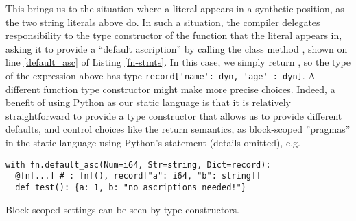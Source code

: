 This brings us to the situation where a literal appears in a synthetic position, as the two string literals above do. In such a situation, the compiler delegates responsibility to the type constructor of the function that the literal appears in, asking it to provide a ``default ascription'' by calling the class method , shown on line \ref{default_asc} of Listing \ref{fn-stmts}. In this case, we simply return , so the type of the expression above has type \lstinline[basicstyle=\ttfamily\small]{record['name': dyn, 'age' : dyn]}. A different function type constructor might make more precise choices. Indeed, a benefit of using Python as our static language is that it is relatively straightforward to provide a type constructor that allows us to provide different defaults, and control choices like the return semantics, as block-scoped ''pragmas'' in the static language using Python's  statement \cite{python} (details omitted), e.g. 
\begin{codelisting}[h]
\begin{lstlisting}[numbers=none]
with fn.default_asc(Num=i64, Str=string, Dict=record):
  @fn[...] # : fn[(), record["a": i64, "b": string]]
  def test(): {a: 1, b: "no ascriptions needed!"} 
\end{lstlisting}
\caption{Block-scoped settings can be seen by type constructors.}
\label{defaultasc}
\end{codelisting}
\vspace{-10px}



